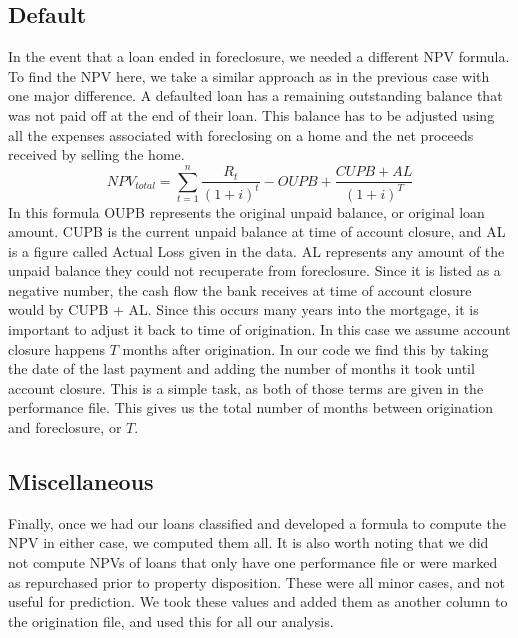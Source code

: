 \documentclass[12 pt]{uncw_thesis}
\theoremstyle{plain}
\theoremstyle{remark}
\theoremstyle{definition}
\begin{document}
\subsection{Default}
In the event that a loan ended in foreclosure, we needed a different NPV formula. To find the NPV here, we take a similar approach as in the previous case with one major difference. A defaulted loan has a remaining outstanding balance that was not paid off at the end of their loan. This balance has to be adjusted using all the expenses associated with foreclosing on a home and the net proceeds received by selling the home. 
\[NPV_{total} = \sum_{t=1}^n \frac{R_t}{(1+i)^t} - OUPB + \frac{CUPB + AL}{(1+i)^T}\]
In this formula OUPB represents the original unpaid balance, or original loan amount. CUPB is the current unpaid balance at time of account closure, and AL is a figure called Actual Loss given in the data. AL represents any amount of the unpaid balance they could not recuperate from foreclosure. Since it is listed as a negative number, the cash flow the bank receives at time of account closure would by CUPB + AL. Since this occurs many years into the mortgage, it is important to adjust it back to time of origination. In this case we assume account closure happens \(T\) months after origination. In our code we find this by taking the date of the last payment and adding the number of months it took until account closure. This is a simple task, as both of those terms are given in the performance file. This gives us the total number of months between origination and foreclosure, or \(T\). 
\subsection{Miscellaneous}
Finally, once we had our loans classified and developed a formula to compute the NPV in either case, we computed them all. It is also worth noting that we did not compute NPVs of loans that only have one performance file or were marked as repurchased prior to property disposition. These were all minor cases, and not useful for prediction. We took these values and added them as another column to the origination file, and used this for all our analysis.
\end{document}
